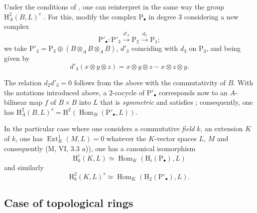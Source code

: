 \begin{env}[18.4.5]
\label{0.18.4.5}
Under the conditions of , one can reinterpret in the same way the group $\mathrm{H}^2_A(B,L)^s$ .
For this, modify the complex $\mathrm{P}_\bullet$ in degree $3$ considering a new complex
\[
  \mathrm{P}'_\bullet:\mathrm{P}'_3\xrightarrow{d'_3}\mathrm{P}_2\xrightarrow{d_2}\mathrm{P}_1;
\]
we take $\mathrm{P}'_3=\mathrm{P}_3\oplus(B\otimes_A B\otimes_A B)$, $d'_3$ coinciding with $d_3$ on $\mathrm{P}_3$, and being given by
\[
  d'_3(x\otimes y\otimes z)=x\otimes y\otimes z-x\otimes z\otimes y.
\]

The relation $d_2 d'_3=0$ follows from the above with the commutativity of $B$.
With the notations introduced above, a $2$-cocycle of $\mathrm{P}'_\bullet$ corresponds now to an $A$-bilinear map $f$ of $B\times B$ into $L$ that is \emph{symmetric} and satisfies ; consequently, one has $\mathrm{H}^2_A(B,L)^s=\mathrm{H}^2(\operatorname{Hom}_B(\mathrm{P}'_\bullet,L))$.
\end{env}

\begin{env}[18.4.6]
\label{0.18.4.6}
In the particular case where one considers a commutative \emph{field} $k$, an extension $K$ of $k$, one has $\operatorname{Ext}^1_K(M,L)=0$ whatever the $K$-vector spaces $L$, $M$ and consequently (M, VI, 3.3 $a$)), one has a canonical isomorphism
\begin{equation}
\tag{18.4.6.1}
  \label{0.18.4.6.1}
  \mathrm{H}^i_k(K,L)\simeq\operatorname{Hom}_K(\mathrm{H}_i(\mathrm{P}_\bullet),L)
\end{equation}
and similarly
\begin{equation}
\tag{18.4.6.2}
  \label{0.18.4.6.2}
  \mathrm{H}^2_k(K,L)^s\simeq\operatorname{Hom}_K(\mathrm{H}_2(\mathrm{P}'_\bullet),L).
\end{equation}
\end{env}

\subsection{Case of topological rings}
\label{subsection:0.18.5}

